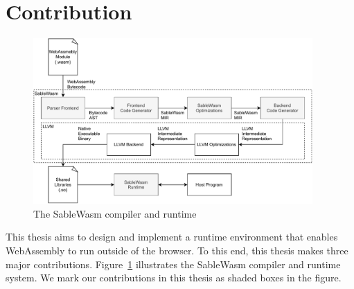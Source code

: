 \section{Contribution}

\begin{figure}
    \centering
    \includegraphics[width=0.95\textwidth]{Images/design}
    \caption{The SableWasm compiler and runtime}
    \label{fig:design}
\end{figure}

This thesis aims to design and implement a runtime environment that enables
WebAssembly to run outside of the browser. To this end, this thesis makes three
major contributions. Figure~\ref{fig:design} illustrates the SableWasm compiler
and runtime system. We mark our contributions in this thesis as shaded boxes
in the figure.

